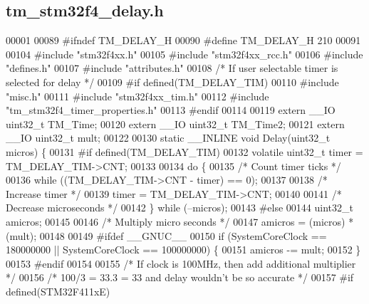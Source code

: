 \hypertarget{tm__stm32f4__delay_8h_source}{}\subsection{tm\+\_\+stm32f4\+\_\+delay.\+h}

\begin{DoxyCode}
00001 
00089 \textcolor{preprocessor}{#ifndef TM\_DELAY\_H}
00090 \textcolor{preprocessor}{#define TM\_DELAY\_H 210}
00091 
00104 \textcolor{preprocessor}{#include "stm32f4xx.h"}
00105 \textcolor{preprocessor}{#include "stm32f4xx\_rcc.h"}
00106 \textcolor{preprocessor}{#include "defines.h"}
00107 \textcolor{preprocessor}{#include "attributes.h"}
00108 \textcolor{comment}{/* If user selectable timer is selected for delay */}
00109 \textcolor{preprocessor}{#if defined(TM\_DELAY\_TIM)}
00110 \textcolor{preprocessor}{#include "misc.h"}
00111 \textcolor{preprocessor}{#include "stm32f4xx\_tim.h"}
00112 \textcolor{preprocessor}{#include "tm\_stm32f4\_timer\_properties.h"}
00113 \textcolor{preprocessor}{#endif}
00114 
00119 \textcolor{keyword}{extern} \_\_IO uint32\_t TM\_Time;
00120 \textcolor{keyword}{extern} \_\_IO uint32\_t TM\_Time2;
00121 \textcolor{keyword}{extern} \_\_IO uint32\_t mult;
00122 
00130 \textcolor{keyword}{static} \_\_INLINE \textcolor{keywordtype}{void} Delay(uint32\_t micros) \{
00131 \textcolor{preprocessor}{#if defined(TM\_DELAY\_TIM)}
00132     \textcolor{keyword}{volatile} uint32\_t timer = TM\_DELAY\_TIM->CNT;
00133 
00134     \textcolor{keywordflow}{do} \{
00135         \textcolor{comment}{/* Count timer ticks */}
00136         \textcolor{keywordflow}{while} ((TM\_DELAY\_TIM->CNT - timer) == 0);
00137 
00138         \textcolor{comment}{/* Increase timer */}
00139         timer = TM\_DELAY\_TIM->CNT;
00140 
00141         \textcolor{comment}{/* Decrease microseconds */}
00142     \} \textcolor{keywordflow}{while} (--micros);
00143 \textcolor{preprocessor}{#else}
00144     uint32\_t amicros;
00145 
00146     \textcolor{comment}{/* Multiply micro seconds */}
00147     amicros = (micros) * (mult);
00148 
00149 \textcolor{preprocessor}{    #ifdef \_\_GNUC\_\_}
00150         \textcolor{keywordflow}{if} (SystemCoreClock == 180000000 || SystemCoreClock == 100000000) \{
00151             amicros -= mult;
00152         \}
00153 \textcolor{preprocessor}{    #endif}
00154 
00155     \textcolor{comment}{/* If clock is 100MHz, then add additional multiplier */}
00156     \textcolor{comment}{/* 100/3 = 33.3 = 33 and delay wouldn't be so accurate */}
00157 \textcolor{preprocessor}{    #if defined(STM32F411xE)}

\end{DoxyCode}
